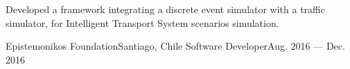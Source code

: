 \documentclass[letterpaper,10pt]{article}
\begin{document}
Developed a framework integrating a discrete event simulator with a traffic simulator, for Intelligent Transport System scenarios simulation.







\resumeSubheading
{Epistemonikos Foundation}{Santiago, Chile}
{Software Developer}{Aug. 2016 --- Dec. 2016}
\end{document}
